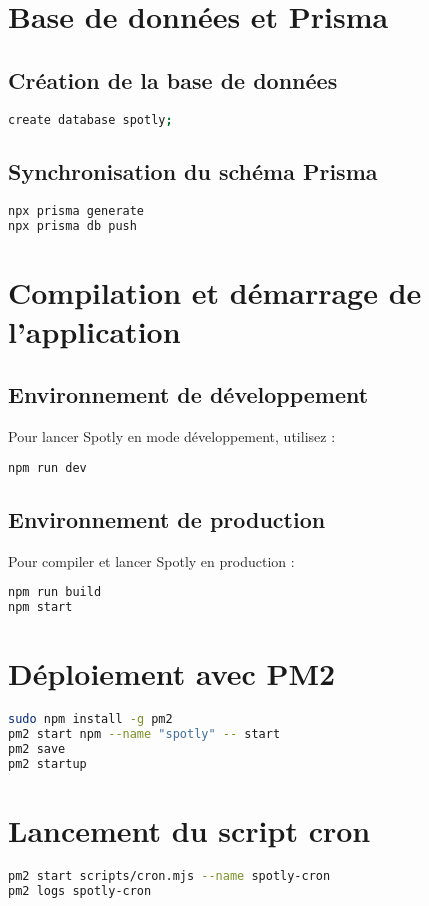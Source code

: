 \documentclass[a4paper,12pt]{article}
\begin{document}
\section{Base de données et Prisma}
\subsection{Création de la base de données}
\begin{lstlisting}[language=bash]
create database spotly;
\end{lstlisting}

\subsection{Synchronisation du schéma Prisma}
\begin{lstlisting}[language=bash]
npx prisma generate
npx prisma db push
\end{lstlisting}

\section{Compilation et démarrage de l'application}
\subsection{Environnement de développement}
Pour lancer Spotly en mode développement, utilisez :
\begin{lstlisting}[language=bash]
npm run dev
\end{lstlisting}

\subsection{Environnement de production}
Pour compiler et lancer Spotly en production :
\begin{lstlisting}[language=bash]
npm run build
npm start
\end{lstlisting}


\section{Déploiement avec PM2}
\begin{lstlisting}[language=bash]
sudo npm install -g pm2
pm2 start npm --name "spotly" -- start
pm2 save
pm2 startup
\end{lstlisting}

\section{Lancement du script cron}
\begin{lstlisting}[language=bash]
pm2 start scripts/cron.mjs --name spotly-cron
pm2 logs spotly-cron
\end{lstlisting}
\newpage
\end{document}

